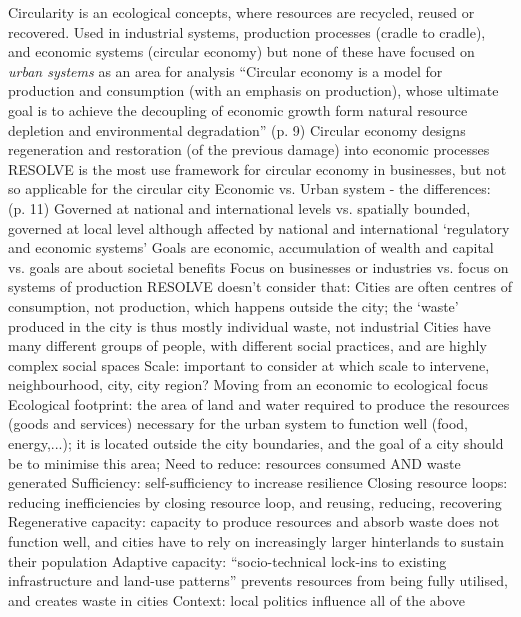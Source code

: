 \documentclass{article}
\begin{document}
\begin{outline}
	\1 Circularity is an ecological concepts, where resources are recycled, reused or recovered. Used in industrial systems, production processes (cradle to cradle), and economic systems (circular economy) but none of these have focused on \textit{urban systems} as an area for analysis 
	\1 ``Circular economy is a model for production and consumption (with an emphasis on production), whose ultimate goal is to achieve the decoupling of economic growth form natural resource depletion and environmental degradation'' (p. 9)
		\2 Circular economy designs regeneration and restoration (of the previous damage) into economic processes
		\2 RESOLVE is the most use framework for circular economy in businesses, but not so applicable for the circular city
	\1 Economic vs. Urban system - the differences: (p. 11)
		\2 Governed at national and international levels vs. spatially bounded, governed at local level although affected by national and international `regulatory and economic systems'
		\2 Goals are economic, accumulation of wealth and capital vs. goals are about societal benefits
		\2 Focus on businesses or industries vs. focus on systems of production
		\2 RESOLVE doesn't consider that:
			\3 Cities are often centres of consumption, not production, which happens outside the city; the `waste' produced in the city is thus mostly individual waste, not industrial
			\3 Cities have many different groups of people, with different social practices, and are highly complex social spaces
			\3 Scale:  important to consider at which scale to intervene, neighbourhood, city, city region?
	\1 Moving from an economic to ecological focus
		\2 Ecological footprint: the area of land and water required to produce the resources (goods and services) necessary for the urban system to function well (food, energy,...); it is located outside the city boundaries, and the goal of a city should be to minimise this area; Need to reduce: resources consumed AND waste generated
		\2 Sufficiency: self-sufficiency to increase resilience 
		\2 Closing resource loops: reducing inefficiencies by closing resource loop, and reusing, reducing, recovering
		\2 Regenerative capacity: capacity to produce resources and absorb waste does not function well, and cities have to rely on increasingly larger hinterlands to sustain their population
		\2 Adaptive capacity: ``socio-technical lock-ins to existing infrastructure and land-use patterns'' prevents resources from being fully utilised, and creates waste in cities 
		\2 Context: local politics influence all of the above

\end{outline}
\end{document}
